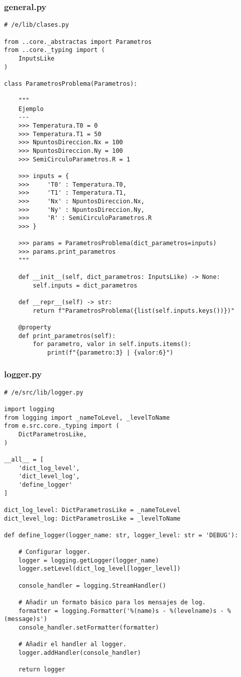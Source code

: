 \subsubsection{general.py}
\begin{verbatim}
# /e/lib/clases.py

from ..core._abstractas import Parametros
from ..core._typing import (
    InputsLike
)

class ParametrosProblema(Parametros):
    
    """
    Ejemplo
    ---
    >>> Temperatura.T0 = 0
    >>> Temperatura.T1 = 50
    >>> NpuntosDireccion.Nx = 100
    >>> NpuntosDireccion.Ny = 100
    >>> SemiCirculoParametros.R = 1

    >>> inputs = {
    >>>     'T0' : Temperatura.T0,
    >>>     'T1' : Temperatura.T1,
    >>>     'Nx' : NpuntosDireccion.Nx,
    >>>     'Ny' : NpuntosDireccion.Ny,
    >>>     'R' : SemiCirculoParametros.R
    >>> }

    >>> params = ParametrosProblema(dict_parametros=inputs)
    >>> params.print_parametros
    """
    
    def __init__(self, dict_parametros: InputsLike) -> None:
        self.inputs = dict_parametros
        
    def __repr__(self) -> str:
        return f"ParametrosProblema({list(self.inputs.keys())})"
        
    @property
    def print_parametros(self):
        for parametro, valor in self.inputs.items():
            print(f"{parametro:3} | {valor:6}")   
\end{verbatim}


\subsubsection{logger.py}
\begin{verbatim}
# /e/src/lib/logger.py

import logging
from logging import _nameToLevel, _levelToName
from e.src.core._typing import (
    DictParametrosLike,
)

__all__ = [
    'dict_log_level',
    'dict_level_log',
    'define_logger'
]

dict_log_level: DictParametrosLike = _nameToLevel
dict_level_log: DictParametrosLike = _levelToName

def define_logger(logger_name: str, logger_level: str = 'DEBUG'):
    
    # Configurar logger.
    logger = logging.getLogger(logger_name)
    logger.setLevel(dict_log_level[logger_level])

    console_handler = logging.StreamHandler()

    # Añadir un formato básico para los mensajes de log.
    formatter = logging.Formatter('%(name)s - %(levelname)s - %(message)s')
    console_handler.setFormatter(formatter)

    # Añadir el handler al logger.
    logger.addHandler(console_handler)
    
    return logger
\end{verbatim}


